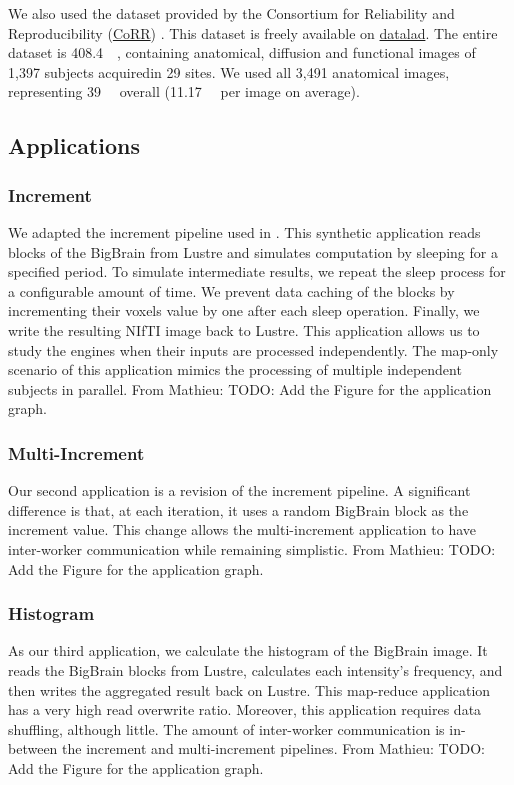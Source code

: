 \documentclass[conference]{IEEEtran}
\newcommand{\MD}[1]{\color{magenta}From Mathieu: #1 \color{black}}
\begin{document}
We also used the dataset provided by the Consortium for Reliability and Reproducibility (\href{http://fcon_1000.projects.nitrc.org/indi/CoRR/html/}{CoRR}) \cite{zuo2014open}.
This dataset is freely available on \href{https://datasets.datalad.org/?dir=/corr/RawDataBIDS}{datalad}.
The entire dataset is \SI{408.4}{\giga\byte}, containing anatomical, diffusion and functional images of 1,397 subjects acquiredin 29 sites.
We used all 3,491 anatomical images, representing \SI{39}{\giga\byte} overall (\SI{11.17}{\mega\byte} per image on average).
	
\subsection{Applications}
\subsubsection{Increment}
We adapted the increment pipeline used in \cite{hayot2019performance}.
This synthetic application reads blocks of the BigBrain from Lustre and simulates computation by sleeping for a specified period.
To simulate intermediate results, we repeat the sleep process for a configurable amount of time.
We prevent data caching of the blocks by incrementing their voxels value by one after each sleep operation.
Finally, we write the resulting NIfTI image back to Lustre.
This application allows us to study the engines when their inputs are processed independently.
The map-only scenario of this application mimics the processing of multiple independent subjects in parallel.
\MD{TODO: Add the Figure for the application graph.}
	
\subsubsection{Multi-Increment}
Our second application is a revision of the increment pipeline.
A significant difference is that, at each iteration, it uses a random BigBrain block as the increment value. 
This change allows the multi-increment application to have inter-worker communication while remaining simplistic.
\MD{TODO: Add the Figure for the application graph.}
	
\subsubsection{Histogram}
As our third application, we calculate the histogram of the BigBrain image. 
It reads the BigBrain blocks from Lustre, calculates each intensity's frequency, and then writes the aggregated result back on Lustre.
This map-reduce application has a very high read overwrite ratio.
Moreover, this application requires data shuffling, although little. 
The amount of inter-worker communication is in-between the increment and multi-increment pipelines.
\MD{TODO: Add the Figure for the application graph.}
	
\end{document}
